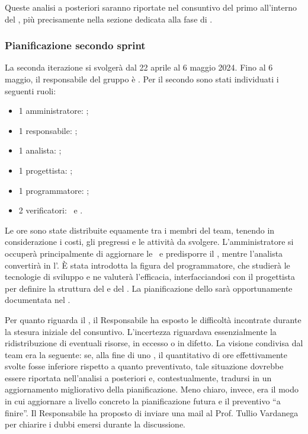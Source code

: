 \vspace{0.5\baselineskip}
\par Queste analisi a posteriori saranno riportate nel consuntivo del primo  all'interno del \PdP, più precisamente nella sezione dedicata alla fase di .

\subsubsection{Pianificazione secondo sprint}
\par La seconda iterazione si svolgerà dal 22 aprile al 6 maggio 2024. Fino al 6 maggio, il
responsabile del gruppo è \raul. Per il secondo  sono stati individuati i seguenti ruoli:
\begin{itemize}
	\item 1 amministratore: \riccardo;
	\item 1 responsabile: \raul;
	\item 1 analista: \tommaso;
	\item 1 progettista: \sebastiano;
  \item 1 programmatore: \marco;
	\item 2 verificatori: \mattia\ e \martina.
\end{itemize}

\vspace{0.5\baselineskip}
\par Le ore sono state distribuite equamente tra i membri del team, tenendo in considerazione i costi, gli  pregressi e le attività da svolgere. L'amministratore si occuperà principalmente di aggiornare le \NdP\ e predisporre il \PdQ, mentre l'analista convertirà in  l'\AdR. È stata introdotta la figura del programmatore, che studierà le tecnologie di sviluppo e ne valuterà l'efficacia, interfacciandosi con il progettista per definire la struttura del  e del . La pianificazione dello  sarà opportunamente documentata nel \PdP. 
\par Per quanto riguarda il \PdP, il Responsabile ha esposto le difficoltà incontrate durante la stesura iniziale del consuntivo. L'incertezza riguardava essenzialmente la ridistribuzione di eventuali risorse, in eccesso o in difetto. La visione condivisa dal team era la seguente: se, alla fine di uno , il quantitativo di ore effettivamente svolte fosse inferiore rispetto a quanto preventivato, tale situazione dovrebbe essere riportata nell'analisi a posteriori e, contestualmente, tradursi in un aggiornamento migliorativo della pianificazione. Meno chiaro, invece, era il modo in cui aggiornare a livello concreto la pianificazione futura e il preventivo “a finire”. Il Responsabile ha proposto di inviare una mail al Prof. Tullio Vardanega per chiarire i dubbi emersi durante la discussione.


